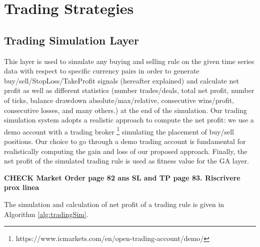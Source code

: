 \section{Trading Strategies}

\subsection{Trading Simulation Layer}
This layer is used to simulate any buying and selling rule on the given time series data with respect to specific currency pairs in order to generate buy/sell/StopLoss/TakeProfit signals (hereafter explained) and calculate net profit as well as different statistics (number trades/deals, total net profit, number of ticks, balance drawdown absolute/max/relative, consecutive wins/profit, consecutive losses, and many others.) at the end of the simulation. Our trading simulation system adopts a realistic approach to compute the net profit: we use a demo account with a trading broker \footnote{https://www.icmarkets.com/en/open-trading-account/demo/} simulating the placement of buy/sell positions. Our choice to go through a demo trading account is fundamental for realistically computing the gain and loss of our proposed approach. Finally, the net profit of the simulated trading rule is used as fitness value for the GA layer. 


\textbf{CHECK Market Order page 82 ans SL and TP page 83. Riscrivere prox linea}

The simulation and calculation of net profit of a trading rule is given in Algorithm \ref{alg:tradingSim}.


